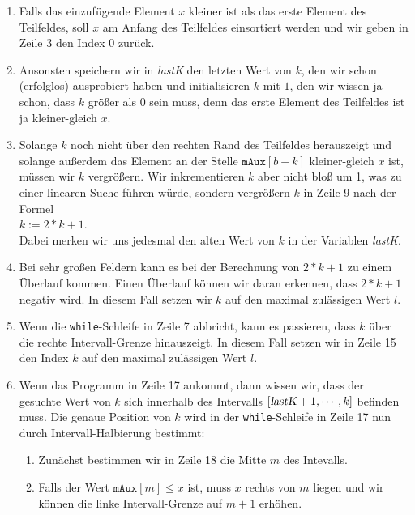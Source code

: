 \begin{enumerate}
\item Falls das einzuf\"ugende Element $x$ kleiner ist als das erste Element des Teilfeldes,
      soll $x$ am Anfang des Teilfeldes einsortiert werden und wir geben in Zeile
      3 den Index 0 zur\"uck.
\item Ansonsten speichern wir in \textsl{lastK} den letzten Wert von $k$, den wir schon
      (erfolglos) ausprobiert haben und initialisieren $k$ mit $1$, den wir wissen ja schon,
      dass $k$ gr\"o{\ss}er als $0$ sein muss, denn das erste Element des Teilfeldes ist ja kleiner-gleich
      $x$.
\item Solange $k$ noch nicht \"uber den rechten Rand des Teilfeldes herauszeigt und solange au{\ss}erdem
      das Element an der Stelle $\mathtt{mAux}[b + k]$ kleiner-gleich $x$ ist, m\"ussen wir $k$ vergr\"o{\ss}ern.
      Wir inkrementieren $k$ aber nicht blo{\ss} um 1, was zu einer linearen Suche f\"uhren w\"urde, sondern
      vergr\"o{\ss}ern $k$ in Zeile 9 nach der Formel
      \\[0.2cm]
      \hspace*{1.3cm}
      $k := 2 * k + 1$.
      \\[0.2cm]
      Dabei merken wir uns jedesmal den alten Wert von $k$ in der Variablen \textsl{lastK}.
\item Bei sehr gro{\ss}en Feldern kann es bei der Berechnung von $2 * k + 1$ zu einem
      \"Uberlauf kommen.  Einen \"Uberlauf k\"onnen wir daran erkennen, dass $2 * k + 1$ negativ wird.
      In diesem Fall setzen wir $k$ auf den maximal zul\"assigen Wert $l$.
\item Wenn die \texttt{while}-Schleife in Zeile 7 abbricht, kann es passieren, dass $k$ \"uber die
      rechte Intervall-Grenze 
      hinauszeigt.  In diesem Fall setzen wir in Zeile 15 den Index $k$ auf den maximal zul\"assigen Wert $l$.
\item Wenn das Programm in Zeile 17 ankommt, dann wissen wir, dass der gesuchte Wert von $k$ sich
      innerhalb des Intervalls $[\textsl{lastK}+ 1, \cdots, k]$ befinden muss.  Die genaue Position
      von $k$ wird in der \texttt{while}-Schleife in Zeile 17 nun durch Intervall-Halbierung
      bestimmt:
      \begin{enumerate}
      \item Zun\"achst bestimmen wir in Zeile 18 die Mitte $m$ des Intevalls.
      \item Falls der Wert $\mathtt{mAux}[m] \leq x$ ist, muss $x$ rechts von $m$ liegen
            und wir k\"onnen die linke Intervall-Grenze auf $m+1$ erh\"ohen.

\end{enumerate}
\end{enumerate}
